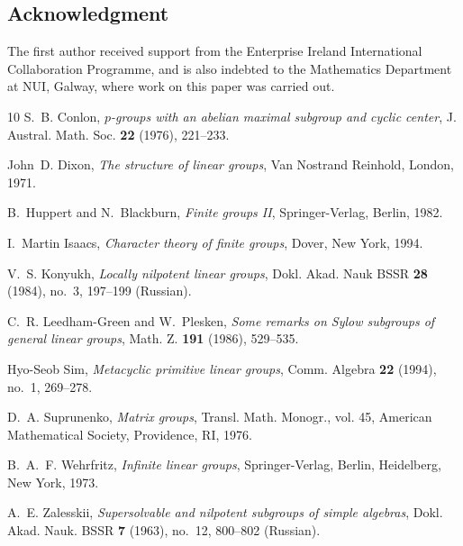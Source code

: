 \documentclass[12pt]{amsart}
\theoremstyle{definition}
\theoremstyle{remark}
\begin{document}
\subsection*{Acknowledgment}
 The first author received support 
 from the Enterprise Ireland International Collaboration 
 Programme, and is also indebted
 to the Mathematics Department at NUI, Galway, where
 work on this paper was carried out.


\begin{thebibliography}{10}
S.~B. Conlon, \emph{$p$-groups with an abelian maximal subgroup and cyclic
  center}, J. Austral. Math. Soc. \textbf{22} (1976), 221--233.

John~D. Dixon, \emph{The structure of linear groups}, Van Nostrand Reinhold,
  London, 1971.

B.~Huppert and N.~Blackburn, \emph{Finite groups {II}}, Springer-Verlag,
  Berlin, 1982.

I.~Martin Isaacs, \emph{Character theory of finite groups}, Dover, New York,
  1994.

V.~S. Konyukh, \emph{Locally nilpotent linear groups}, Dokl. Akad. Nauk BSSR
  \textbf{28} (1984), no.~3, 197--199 (Russian).

C.~R. Leedham-Green and W.~Plesken, \emph{Some remarks on {Sylow} subgroups of
  general linear groups}, Math. Z. \textbf{191} (1986), 529--535.

Hyo-Seob Sim, \emph{Metacyclic primitive linear groups}, Comm. Algebra
  \textbf{22} (1994), no.~1, 269--278.

D.~A. Suprunenko, \emph{Matrix groups}, Transl. Math. Monogr., vol. 45,
  American Mathematical Society, Providence, RI, 1976.

B.~A.~F. Wehrfritz, \emph{Infinite linear groups}, Springer-Verlag, Berlin,
  Heidelberg, New York, 1973.

A.~E. Zalesskii, \emph{Supersolvable and nilpotent subgroups of simple
  algebras}, Dokl. Akad. Nauk. BSSR \textbf{7} (1963), no.~12, 800--802
  (Russian).
\end{thebibliography}
\end{document}

